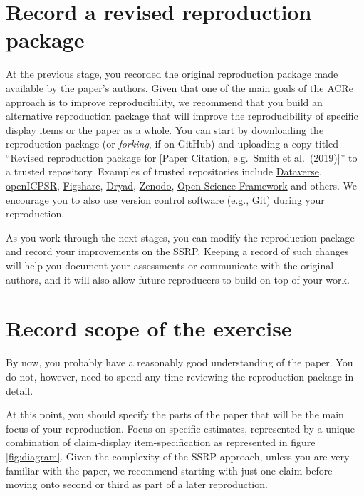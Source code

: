 \documentclass[
]{book}
\begin{document}
\hypertarget{record-a-revised-reproduction-package}{%
\section{Record a revised reproduction package}\label{record-a-revised-reproduction-package}}

At the previous stage, you recorded the original reproduction package made available by the paper's authors. Given that one of the main goals of the ACRe approach is to improve reproducibility, we recommend that you build an alternative reproduction package that will improve the reproducibility of specific display items or the paper as a whole.
You can start by downloading the reproduction package (or \emph{forking}, if on GitHub) and uploading a copy titled ``Revised reproduction package for {[}Paper Citation, e.g.~Smith et al.~(2019){]}'' to a trusted repository. Examples of trusted repositories include \href{https://dataverse.org/}{Dataverse}, \href{https://www.openicpsr.org/openicpsr/}{openICPSR}, \href{https://figshare.com}{Figshare}, \href{https://datadryad.org/stash}{Dryad}, \href{https://about.zenodo.org/}{Zenodo}, \href{osf.io/}{Open Science Framework} and others. We encourage you to also use version control software (e.g., Git) during your reproduction.

As you work through the next stages, you can modify the reproduction package and record your improvements on the SSRP. Keeping a record of such changes will help you document your assessments or communicate with the original authors, and it will also allow future reproducers to build on top of your work.

\hypertarget{declare-estimates}{%
\section{Record scope of the exercise}\label{declare-estimates}}

By now, you probably have a reasonably good understanding of the paper. You do not, however, need to spend any time reviewing the reproduction package in detail.

At this point, you should specify the parts of the paper that will be the main focus of your reproduction. Focus on specific estimates, represented by a unique combination of claim-display item-specification as represented in figure \ref{fig:diagram}. Given the complexity of the SSRP approach, unless you are very familiar with the paper, we recommend starting with just one claim before moving onto second or third as part of a later reproduction.
\end{document}
